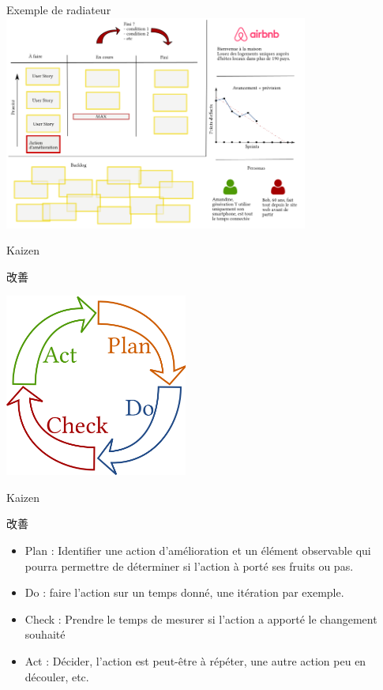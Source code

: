 \documentclass{beamer}
\begin{document}
\begin{frame}{Exemple de radiateur}
  \center
  \includegraphics[width=10cm]{includes/radiateur}
\end{frame}

\begin{frame}{Kaizen 
    {\begin{CJK*}{UTF8}{mj} 改善 \end{CJK*}}
  }
  \center
  \includegraphics[width=6cm]{includes/pdca}
\end{frame}

\begin{frame}{Kaizen 
    {\begin{CJK*}{UTF8}{mj} 改善 \end{CJK*}}
  }
  
  \begin{itemize}
    \item \alert{Plan} : Identifier une action d'amélioration et un élément observable qui pourra permettre de déterminer si l'action à porté ses fruits ou pas.
    \item \alert{Do} : faire l'action sur un temps donné, une itération par exemple.
    \item \alert{Check} : Prendre le temps de mesurer si l'action a apporté le changement souhaité
    \item \alert{Act} : Décider, l'action est peut-être à répéter, une autre action peu en découler, etc.
  \end{itemize}

\end{frame}
\end{document}
